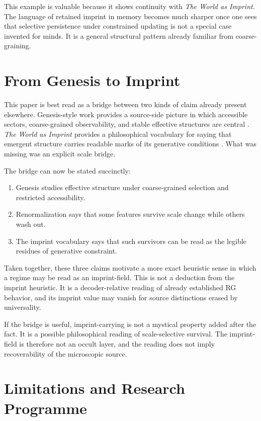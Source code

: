 \documentclass[12pt,a4paper]{article}
\begin{document}
This example is valuable because it shows continuity with \emph{The World as Imprint}. The language of retained imprint in memory becomes much sharper once one sees that selective persistence under constrained updating is not a special case invented for minds. It is a general structural pattern already familiar from coarse-graining.

\section{From Genesis to Imprint}

This paper is best read as a bridge between two kinds of claim already present elsewhere. Genesis-style work provides a source-side picture in which accessible sectors, coarse-grained observability, and stable effective structures are central \cite{HAFFA,HAFFD,FoundationI}. \emph{The World as Imprint} provides a philosophical vocabulary for saying that emergent structure carries readable marks of its generative conditions \cite{WorldImprint}. What was missing was an explicit scale bridge.

The bridge can now be stated succinctly:

\begin{enumerate}
\item Genesis studies effective structure under coarse-grained selection
and restricted accessibility.
\item Renormalization says that some features survive scale change while others wash out.
\item The imprint vocabulary says that such survivors can be read as the legible residues of generative constraint.
\end{enumerate}

Taken together, these three claims motivate a more exact heuristic sense
in which a regime may be read as an imprint-field. This is not a
deduction from the imprint heuristic. It is a decoder-relative reading
of already established RG behavior, and its imprint value may vanish for
source distinctions erased by universality.

If the bridge is useful, imprint-carrying is not a mystical property
added after the fact. It is a possible philosophical reading of
scale-selective survival. The imprint-field is therefore not an occult
layer, and the reading does not imply recoverability of the microscopic
source.

\section{Limitations and Research Programme}
\end{document}
